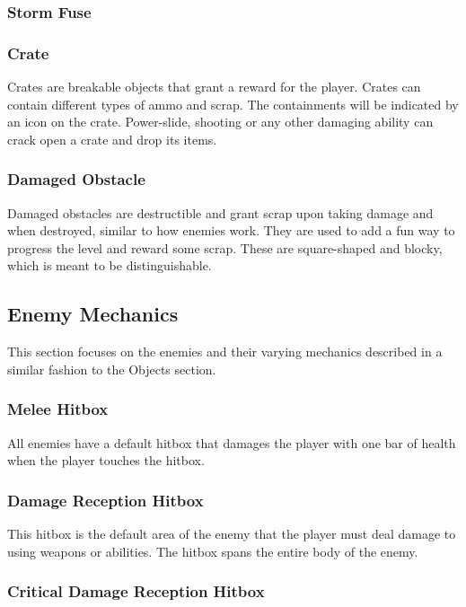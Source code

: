 \documentclass[12pt]{article}
\begin{document}
\subsubsection{Storm Fuse}

\subsubsection{Crate}

Crates are breakable objects that grant a reward for the player. Crates can contain different types of ammo and scrap. The containments will be indicated by an icon on the crate. Power-slide, shooting or any other damaging ability can crack open a crate and drop its items. 

\subsubsection{Damaged Obstacle}

Damaged obstacles are destructible and grant scrap upon taking damage and when destroyed, similar to how enemies work. They are used to add a fun way to progress the level and reward some scrap. These are square-shaped and blocky, which is meant to be distinguishable.

\subsection{Enemy Mechanics}

This section focuses on the enemies and their varying mechanics described in a similar fashion to the Objects section. 

\subsubsection{Melee Hitbox}

All enemies have a default hitbox that damages the player with one bar of health when the player touches the hitbox. 

\subsubsection{Damage Reception Hitbox}

This hitbox is the default area of the enemy that the player must deal damage to using weapons or abilities. The hitbox spans the entire body of the enemy.

\subsubsection{Critical Damage Reception Hitbox}
\end{document}

